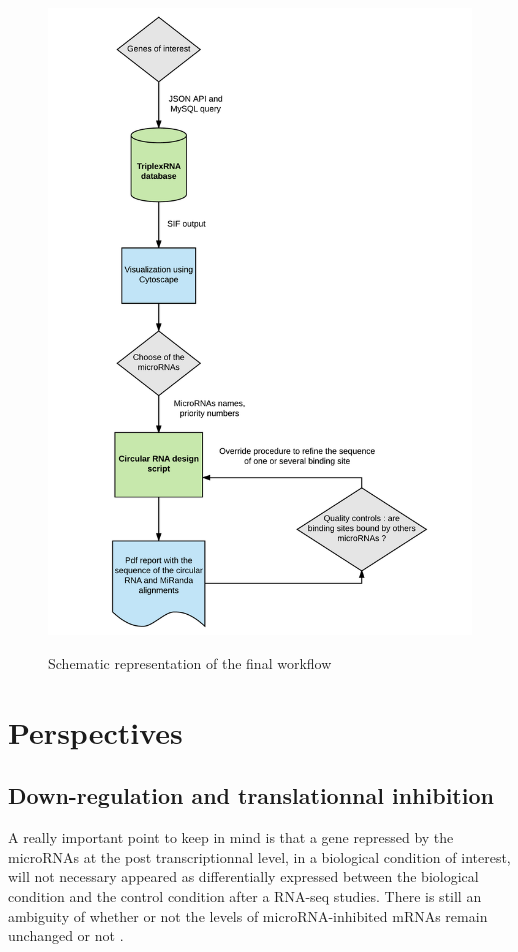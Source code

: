 \documentclass[a4paper,12pt]{report}
\begin{document}
\begin{figure}[H]
	\centering
	{\includegraphics[width=1\textwidth]{Final_Workflow.png}}
	\caption{Schematic representation of the final workflow}
\end{figure}

\section{Perspectives}
\subsection{Down-regulation and translationnal inhibition}


A really important point to keep in mind is that a gene repressed by the microRNAs at the post transcriptionnal level, in a biological condition of interest, will not necessary appeared as differentially expressed between the biological condition and the control condition after a RNA-seq studies. There is still an ambiguity of whether or not the levels of microRNA-inhibited mRNAs remain unchanged or not \cite{cancer}.\\
\end{document}
